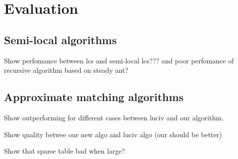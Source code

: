\section{Evaluation}
\label{section:evaluation}

\subsection*{Semi-local algorithms}
Show perfomance between lcs and semi-local lcs??? and poor perfomance of recursive algorithm based on steady ant?

\subsection*{Approximate matching algorithms}
Show outperforming for different cases between luciv and our algorithm.

Show quality betwee our new algo and  luciv algo (our should be better)

Show that sparse table bad when large?
 
